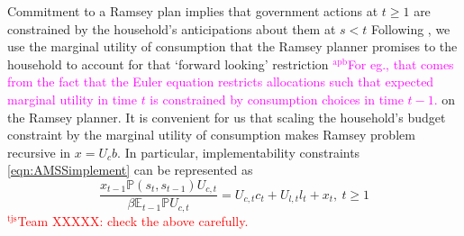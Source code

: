 \documentclass[12pt]{article}
\newcommand{\apb}[1]{\textcolor{magenta}{$^{\textrm{apb}}${#1}}}
\newcommand{\tjs}[1]{\textcolor{red}{$^{\textrm{tjs}}${#1}}}
\newcommand{\EE}{\mathbb E}
\begin{document}
  Commitment to a Ramsey plan implies that government actions at $t \geq 1$ are constrained by the household's anticipations about them at $s < t$
	 Following \citet{Kydland1980}, we  use the  marginal utility of consumption that the
Ramsey planner promises to the household to account for that `forward looking' restriction \apb{For eg., that comes from the fact that the Euler equation restricts allocations such that expected marginal utility in time $t$ is constrained by consumption choices in time $t-1$. }on the Ramsey planner.  It is convenient for us that scaling the household's  budget constraint by the  marginal utility
 of consumption makes Ramsey problem  recursive in  $x=U_c b$.  In particular, implementability constraints \eqref{eqn:AMSSimplement}
 can be represented as
		\begin{equation}
		\frac{x_{t-1} \mathbb{P}(s_t,s_{t-1}) U_{c,t}}{\beta \EE_{t-1} \mathbb{P}U_{c,t}}  = U_{c,t}c_t+U_{l,t} l_t + x_t, \ t \geq 1
	\end{equation}
\tjs{Team XXXXX: check the above carefully.}
\end{document}
